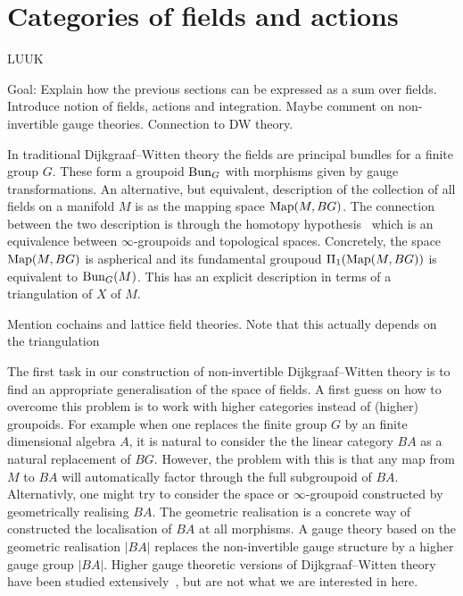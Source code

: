 
\section{Categories of fields and actions}

LUUK

Goal: Explain how the previous sections can be expressed as a sum over fields. Introduce notion of fields, actions and integration. Maybe comment on non-invertible gauge theories. Connection to DW theory.

In traditional Dijkgraaf--Witten theory the fields are principal bundles for a finite
group $G$. These form a groupoid $\operatorname{Bun}_G$ with morphisms given by gauge
transformations. An alternative, but equivalent, description of the collection of all fields on a manifold $M$ is as the mapping space $\operatorname{Map}(M,BG)$. The connection
between the two description is through the homotopy hypothesis~\cite{} which is
an equivalence between $\infty$-groupoids and topological spaces. Concretely,
the space $\operatorname{Map}(M,BG)$ is aspherical and its fundamental groupoud $\Pi_1
(\operatorname{Map}(M,BG))$ is equivalent to $\operatorname{Bun}_G(M)$.
This has an explicit description in terms of a triangulation of $X$ of $M$.

\color{red} Mention cochains and lattice field theories. Note that this actually
depends on the triangulation \color{black}

The first task in our construction of non-invertible Dijkgraaf--Witten theory
is to find an appropriate generalisation of the space of fields. A first guess
on how to overcome this problem is to work with higher categories instead of
(higher) groupoids. For example when one replaces the finite group $G$ by an
finite dimensional algebra $A$, it is natural to consider the the linear category
$BA$ as a natural replacement of $BG$. However, the problem with this is
that any map from $M$ to $BA$ will automatically factor through the full
subgroupoid of $BA$. Alternativly, one might try to consider the space or
$\infty$-groupoid constructed by geometrically realising $BA$. The geometric
realisation is a concrete way of constructed the localisation of $BA$ at all
morphisms. A gauge theory based on the geometric realisation $|BA|$ replaces the
non-invertible gauge structure by a higher gauge group $|BA|$. Higher gauge
theoretic versions of Dijkgraaf--Witten theory have been studied
extensively~\cite{some thing}, but are not what we are interested in here.

